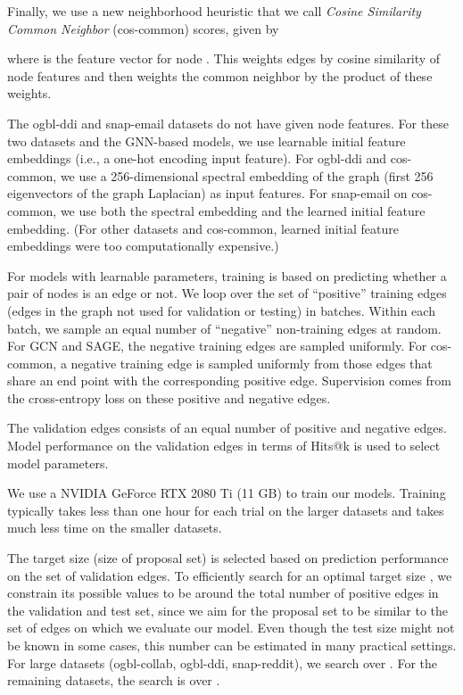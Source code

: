 \documentclass{article}
\newcommand{\xhdr}[1]{\vspace{1.0mm}\noindent{\textbf{#1.}}\hspace{1mm}}
\begin{document}
Finally, we use a new neighborhood heuristic that we call \emph{Cosine Similarity Common Neighbor} (cos-common) scores, given by 

where  is the feature vector for node .
This weights edges by cosine similarity of node features and then weights the common neighbor by the product of these weights.

The ogbl-ddi and snap-email datasets do not have given node features.
For these two datasets and the GNN-based models, we use learnable initial feature embeddings (i.e., a one-hot encoding input feature).
For ogbl-ddi and cos-common, we use a 256-dimensional spectral embedding of the graph (first 256 eigenvectors of the graph Laplacian) as input features.
For snap-email on cos-common, we use both the spectral embedding and the learned initial feature embedding.
(For other datasets and cos-common, learned initial feature embeddings were too computationally expensive.)

\xhdr{Training}
For models with learnable parameters, training is based on predicting whether a pair of nodes is an edge or not.
We loop over the set of ``positive'' training edges (edges in the graph not used for validation or testing) in batches.
Within each batch, we sample an equal number of ``negative'' non-training edges at random.
For GCN and SAGE, the negative training edges are sampled uniformly.
For cos-common, a negative training edge is sampled uniformly from those edges that share an end point 
with the corresponding positive edge.
Supervision comes from the cross-entropy loss on these positive and negative edges.

The validation edges consists of an equal number of positive and negative edges.
Model performance on the validation edges in terms of Hits@k is used to select model parameters.

We use a NVIDIA GeForce RTX 2080 Ti (11 GB) to train our models. 
Training typically takes less than one hour for each trial on the larger datasets and takes much less time on the smaller datasets.


\xhdr{Searching for the target size}
The target size  (size of proposal set) is selected based on prediction performance on the set of validation edges.
To efficiently search for an optimal target size , we constrain its possible values to be around the total number  of positive edges in the validation and test set, since we aim for the proposal set  to be similar to the set of edges on which we evaluate our model.
Even though the test size might not be known in some cases, this number can be estimated in many practical settings.
For large datasets (ogbl-collab, ogbl-ddi, snap-reddit), 
we search over .
For the remaining datasets, the search is over .
\end{document}
